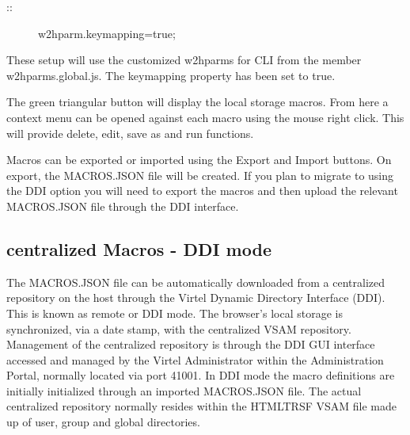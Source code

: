 \documentclass[letterpaper,10pt,english]{sphinxmanual}
\begin{document}
\begin{description}
\item[{::}] \leavevmode
w2hparm.keymapping=true;

\end{description}


These setup will use the customized w2hparms for CLI from the member w2hparms.global.js. The keymapping property has been set to true.

\ignorespaces 
{}

The green triangular button will display the local storage macros. From here a context menu can be opened against each macro using the mouse right click. This will provide delete, edit, save as and run functions.



\ignorespaces 
{}

Macros can be exported or imported using the Export and Import buttons. On export, the MACROS.JSON file will be created. If you plan to migrate to using the DDI option you will need to export the macros and then upload the relevant MACROS.JSON file through the DDI interface.

\ignorespaces 

\subsection{centralized Macros - DDI mode}
\label{\detokenize{Customization:centralized-macros-ddi-mode}}\label{\detokenize{Customization:index-79}}
The MACROS.JSON file can be automatically downloaded from a centralized repository on the host through the Virtel Dynamic Directory Interface (DDI). This is known as remote or DDI mode. The browser’s local storage is synchronized, via a date stamp, with the centralized VSAM repository. Management of the centralized repository is through the DDI GUI interface accessed and managed by the Virtel Administrator within the Administration Portal, normally located via port 41001. In DDI mode the macro definitions are initially initialized through an imported MACROS.JSON file. The actual centralized repository normally resides within the HTMLTRSF VSAM file made up of user, group and global directories.
\end{document}
